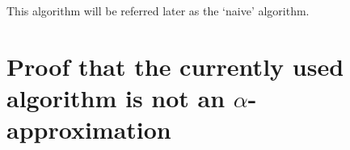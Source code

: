 \documentclass[11pt]{article}
\begin{document}
This algorithm will be referred later as the `naive' algorithm.

\section{Proof that the currently used algorithm is not an $\alpha$-approximation}
\newcommand{\notalphagraph}[1] {
	\begin{tikzpicture}[scale=0.7]
			\def\n{#1}
			\def\height{6}
			\def\width{6}
			\foreach \x in {0,\width} {
				\foreach \y in {0,2,...,\n} {
					\draw [fill] ($(\x,\y*\height/\n)$) circle [radius=0.1];
					\draw [red,middlearrow1={latex},thick] ($(0,\y*\height/\n)$) -- ($(\width,\y*\height/\n)$);
					\ifnum \y > 0 {
						\draw [red,middlearrow1={latex},thick] ($(\width,\y*\height/\n)$) -- ($(\width,\y*\height/\n - \height/\n)$);
						\draw [red,middlearrow1={latex},thick] ($(\width,\y*\height/\n - \height/\n)$) -- ($(0,\y*\height/\n - \height/\n)$);
						\draw [red,middlearrow1={latex},thick] ($(0,\y*\height/\n - \height/\n)$) -- ($(0,\y*\height/\n - \height/\n - \height/\n)$);
					} \else
					\fi
				}
			}
			\draw [red,middlearrow1={latex},thick] (0,0) -- (\width,0);

			\foreach \x in {0,\width} {
				\foreach \y in {0,...,\n} {
					\draw [fill] ($(\x,\y*\height/\n)$) circle [radius=0.1];
				}
			}
			\draw [blue,middlearrow2={latex},thick] (0.05,\height+0.05) -- (0.05,0.05);
			\draw [blue,middlearrow2={latex},thick] (0.05,0.05) -- (\width+0.05,0.05);
			\draw [blue,middlearrow2={latex},thick] (\width+0.05,0.05) -- (\width+0.05,\height+0.05);
		\end{tikzpicture}
}

\newcommand{\notAlphaGraphOnlyRed}[1] {
	\begin{tikzpicture}[scale=0.85]
			\def\n{#1}
			\def\height{5}
			\def\width{5}
			\foreach \x in {0,\width} {
				\foreach \y in {0,...,\n} {
					\draw [fill] ($(\x,\y*\height/\n)$) circle [radius=0.1];
					\draw [red,middlearrow1={latex},thick] ($(0,\y*\height/\n)$) -- ($(\width,\y*\height/\n)$);
					\ifnum \y > 0 {
						\draw [red,middlearrow1={latex},thick] ($(\width,\y*\height/\n)$) -- ($(0,\y*\height/\n - \height/\n)$);
					} \else
					\fi
				}
			}
		\end{tikzpicture}
}
\end{document}

